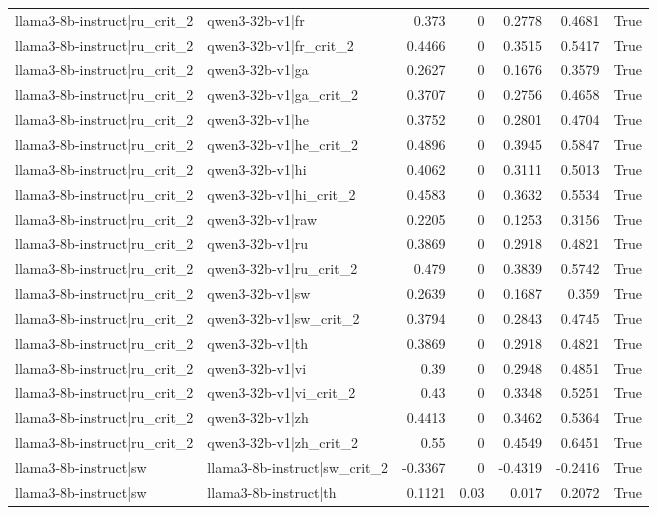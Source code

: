 \begin{table}
\begin{tabular}{l l r r r r l}
llama3-8b-instruct|ru_crit_2 & qwen3-32b-v1|fr & 0.373 & 0 & 0.2778 & 0.4681 & True \\
llama3-8b-instruct|ru_crit_2 & qwen3-32b-v1|fr_crit_2 & 0.4466 & 0 & 0.3515 & 0.5417 & True \\
llama3-8b-instruct|ru_crit_2 & qwen3-32b-v1|ga & 0.2627 & 0 & 0.1676 & 0.3579 & True \\
llama3-8b-instruct|ru_crit_2 & qwen3-32b-v1|ga_crit_2 & 0.3707 & 0 & 0.2756 & 0.4658 & True \\
llama3-8b-instruct|ru_crit_2 & qwen3-32b-v1|he & 0.3752 & 0 & 0.2801 & 0.4704 & True \\
llama3-8b-instruct|ru_crit_2 & qwen3-32b-v1|he_crit_2 & 0.4896 & 0 & 0.3945 & 0.5847 & True \\
llama3-8b-instruct|ru_crit_2 & qwen3-32b-v1|hi & 0.4062 & 0 & 0.3111 & 0.5013 & True \\
llama3-8b-instruct|ru_crit_2 & qwen3-32b-v1|hi_crit_2 & 0.4583 & 0 & 0.3632 & 0.5534 & True \\
llama3-8b-instruct|ru_crit_2 & qwen3-32b-v1|raw & 0.2205 & 0 & 0.1253 & 0.3156 & True \\
llama3-8b-instruct|ru_crit_2 & qwen3-32b-v1|ru & 0.3869 & 0 & 0.2918 & 0.4821 & True \\
llama3-8b-instruct|ru_crit_2 & qwen3-32b-v1|ru_crit_2 & 0.479 & 0 & 0.3839 & 0.5742 & True \\
llama3-8b-instruct|ru_crit_2 & qwen3-32b-v1|sw & 0.2639 & 0 & 0.1687 & 0.359 & True \\
llama3-8b-instruct|ru_crit_2 & qwen3-32b-v1|sw_crit_2 & 0.3794 & 0 & 0.2843 & 0.4745 & True \\
llama3-8b-instruct|ru_crit_2 & qwen3-32b-v1|th & 0.3869 & 0 & 0.2918 & 0.4821 & True \\
llama3-8b-instruct|ru_crit_2 & qwen3-32b-v1|vi & 0.39 & 0 & 0.2948 & 0.4851 & True \\
llama3-8b-instruct|ru_crit_2 & qwen3-32b-v1|vi_crit_2 & 0.43 & 0 & 0.3348 & 0.5251 & True \\
llama3-8b-instruct|ru_crit_2 & qwen3-32b-v1|zh & 0.4413 & 0 & 0.3462 & 0.5364 & True \\
llama3-8b-instruct|ru_crit_2 & qwen3-32b-v1|zh_crit_2 & 0.55 & 0 & 0.4549 & 0.6451 & True \\
llama3-8b-instruct|sw & llama3-8b-instruct|sw_crit_2 & -0.3367 & 0 & -0.4319 & -0.2416 & True \\
llama3-8b-instruct|sw & llama3-8b-instruct|th & 0.1121 & 0.03 & 0.017 & 0.2072 & True \\

\end{tabular}
\end{table}
